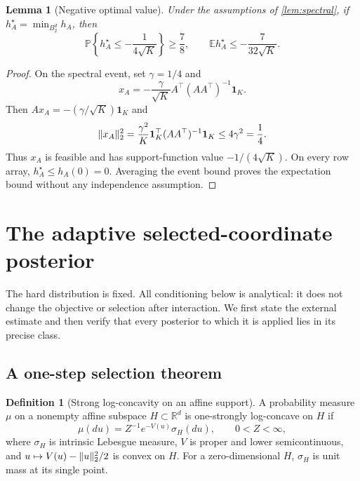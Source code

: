 \documentclass[11pt]{article}
\numberwithin{equation}{section}
\newtheorem{lemma}[lemma]{Lemma}
\theoremstyle{definition}
\newtheorem{definition}[definition]{Definition}
\theoremstyle{remark}
\newcommand{\R}{\mathbb R}
\newcommand{\E}{\mathbb E}
\newcommand{\PP}{\mathbb P}
\newcommand{\one}{\mathbf 1}
\DeclarePairedDelimiter{\norm}{\lVert}{\rVert}
\newcommand{\ball}{B_2^d}
\begin{document}
\begin{lemma}[Negative optimal value]\label{lem:negative-optimum}
Under the assumptions of \cref{lem:spectral}, if $h_A^\star=\min_{\ball}h_A$, then
\begin{equation}\label{eq:negative-optimum}
\PP\left\{h_A^\star\le-\frac1{4\sqrt K}\right\}\ge\frac78,
\qquad
\E h_A^\star\le-\frac7{32\sqrt K}.
\end{equation}
\end{lemma}
\begin{proof}
On the spectral event, set $\gamma=1/4$ and
\[
x_A=-\frac\gamma{\sqrt K}A^\top(AA^\top)^{-1}\one_K.
\]
Then $Ax_A=-(\gamma/\sqrt K)\one_K$ and
\[
\norm{x_A}_2^2
=\frac{\gamma^2}{K}\one_K^\top(AA^\top)^{-1}\one_K
\le4\gamma^2=\frac14.
\]
Thus $x_A$ is feasible and has support-function value $-1/(4\sqrt K)$. On every row array, $h_A^\star\le h_A(0)=0$. Averaging the event bound proves the expectation bound without any independence assumption.
\end{proof}

\section{The adaptive selected-coordinate posterior}\label{sec:posterior}

The hard distribution is fixed. All conditioning below is analytical: it does not change the objective or selection after interaction. We first state the external estimate and then verify that every posterior to which it is applied lies in its precise class.

\subsection{A one-step selection theorem}

\begin{definition}[Strong log-concavity on an affine support]\label{def:slc}
A probability measure $\mu$ on a nonempty affine subspace $H\subset\R^d$ is one-strongly log-concave on $H$ if
\begin{equation}\label{eq:slc-density}
\mu(du)=Z^{-1}e^{-V(u)}\sigma_H(du),\qquad 0<Z<\infty,
\end{equation}
where $\sigma_H$ is intrinsic Lebesgue measure, $V$ is proper and lower semicontinuous, and $u\mapsto V(u)-\norm{u}_2^2/2$ is convex on $H$. For a zero-dimensional $H$, $\sigma_H$ is unit mass at its single point.
\end{definition}
\end{document}
